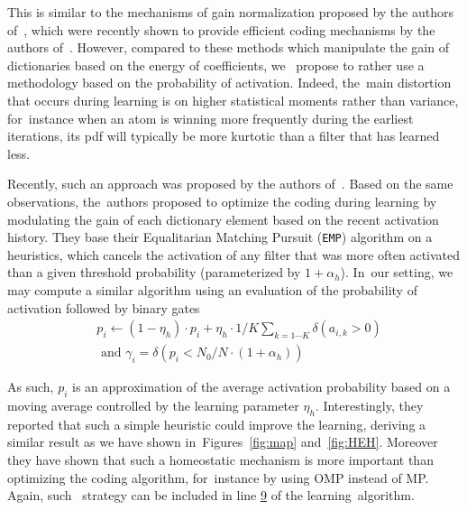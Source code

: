 \documentclass[vision,article,accept,oneauthor,pdftex]{Definitions/mdpi}
\begin{document}
This is similar to the mechanisms of gain normalization proposed by the authors of~\cite{Schwartz01}, which were recently shown to provide efficient coding mechanisms by the authors of~\cite{Simoncelli01}. However, compared to these methods which manipulate the gain of dictionaries based on the energy of coefficients, we~ propose to rather use a methodology based on the probability of activation. Indeed, the~main distortion that occurs during learning is on higher statistical moments rather than variance, for~instance when an atom is winning more frequently during the earliest iterations, its pdf will typically be more kurtotic than a filter that has learned less.

Recently, such an approach was proposed by the authors of~\cite{Sandin17}. Based on the same observations, the~authors proposed to optimize the coding during learning by modulating the gain of each dictionary element based on the recent activation history. They base their Equalitarian Matching Pursuit (\texttt{EMP}) algorithm on a heuristics, which cancels the activation of any filter that was more often activated than a given threshold probability (parameterized by $1+\alpha_h$). In~our setting, we may compute a similar algorithm using an evaluation of the probability of activation followed by binary gates
\begin{align}%
&p_i \leftarrow (1- \eta_h ) \cdot p_i + \eta_h \cdot 1/K\sum_{k=1\cdots K} \delta(a_{i, k} > 0) \\ &\textrm{ and }
\gamma_i = \delta (p_i < N_0/N \cdot (1+\alpha_h) )
\end{align}%

As such, $p_i$ is an approximation of the average activation probability based on a moving average controlled by the learning parameter $\eta_h$.
Interestingly, they reported that such a simple heuristic could improve the learning, deriving a similar result as we have shown in~Figures~\ref{fig:map} and~\ref{fig:HEH}. Moreover they have shown that such a homeostatic mechanism is more important than optimizing the coding algorithm, for~instance by using OMP instead of MP.
Again, such~ strategy can be included in line \hyperlink{here2}{9} of the learning~algorithm.
\end{document}
